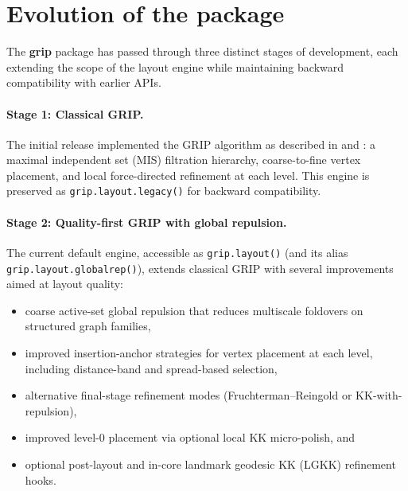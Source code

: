 \section{Evolution of the package}\label{sec:evolution}

The \textbf{grip} package has passed through three distinct stages of
development, each extending the scope of the layout engine while
maintaining backward compatibility with earlier APIs.

\paragraph{Stage 1: Classical GRIP.}
The initial release implemented the GRIP algorithm as described in
\citet{gajer2002} and \citet{gajer2004}: a maximal independent set (MIS)
filtration hierarchy, coarse-to-fine vertex placement, and local
force-directed refinement at each level. This engine is preserved as
\texttt{grip.layout.legacy()} for backward compatibility.

\paragraph{Stage 2: Quality-first GRIP with global repulsion.}
The current default engine, accessible as \texttt{grip.layout()} (and
its alias \texttt{grip.layout.globalrep()}), extends classical GRIP with
several improvements aimed at layout quality:
%
\begin{itemize}
\item coarse active-set global repulsion that reduces multiscale
  foldovers on structured graph families,
\item improved insertion-anchor strategies for vertex placement at each
  level, including distance-band and spread-based selection,
\item alternative final-stage refinement modes (Fruchterman--Reingold
  or KK-with-repulsion),
\item improved level-0 placement via optional local KK micro-polish, and
\item optional post-layout and in-core landmark geodesic KK (LGKK)
  refinement hooks.
\end{itemize}


